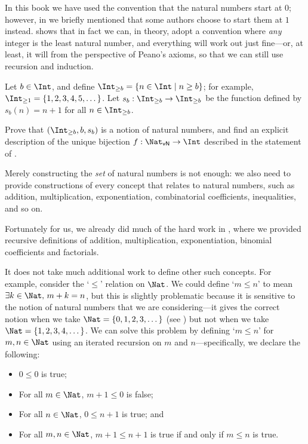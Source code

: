 In this book we have used the convention that the natural numbers start at $0$; however, in  we briefly mentioned that some authors choose to start them at $1$ instead.  shows that in fact we can, in theory, adopt a convention where \textit{any} integer is the least natural number, and everything will work out just fine---or, at least, it will from the perspective of Peano's axioms, so that we can still use recursion and induction.

\begin{exercise}
\label{exNaturalNumbersArbitraryBase}
Let $b \in \Int$, and define $\Int_{\ge b} = \{ n \in \Int \mid n \ge b \}$; for example, $\Int_{\ge 1} = \{ 1, 2, 3, 4, 5, \dots \}$. Let $s_b : \Int_{\ge b} \to \Int_{\ge b}$ be the function defined by $s_b(n) = n+1$ for all $n \in \Int_{\ge b}$.

Prove that $(\Int_{\ge b}, b, s_b)$ is a notion of natural numbers, and find an explicit description of the unique bijection $f : \Nat_{\mathsf{vN}} \to \Int$ described in the statement of .
\end{exercise}

Merely constructing the \textit{set} of natural numbers is not enough: we also need to provide constructions of every concept that relates to natural numbers, such as addition, multiplication, exponentiation, combinatorial coefficients, inequalities, and so on.

Fortunately for us, we already did much of the hard work in , where we provided recursive definitions of addition, multiplication, exponentiation, binomial coefficients and factorials.

It does not take much additional work to define other such concepts. For example, consider the `$\le$' relation on $\Nat$. We could define `$m \le n$' to mean $\exists k \in \Nat,\, m+k=n$, but this is slightly problematic because it is sensitive to the notion of natural numbers that we are considering---it gives the correct notion when we take $\Nat = \{ 0, 1, 2, 3, \dots \}$ (see ) but not when we take $\Nat = \{ 1, 2, 3, 4, \dots \}$. We can solve this problem by defining `$m \le n$' for $m,n \in \Nat$ using an iterated recursion on $m$ and $n$---specifically, we declare the following:
\begin{itemize}
\item $0 \le 0$ is true;
\item For all $m \in \Nat$, $m+1 \le 0$ is false;
\item For all $n \in \Nat$, $0 \le n+1$ is true; and
\item For all $m,n \in \Nat$, $m+1 \le n+1$ is true if and only if $m \le n$ is true.
\end{itemize}

